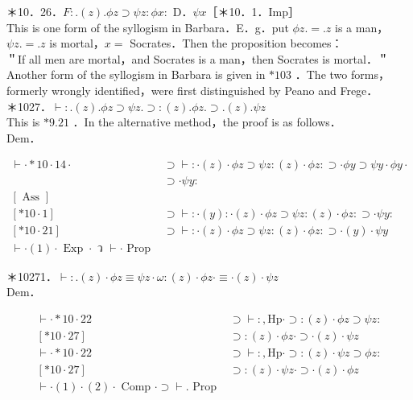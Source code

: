 \documentclass[10pt]{article}
\begin{document}
＊10．26．$F: .(z) . \phi z \supset \psi z: \phi x:$ D．$\psi x$［＊10．1．Imp］\\
This is one form of the syllogism in Barbara．E．g．put $\phi z .=. z$ is a man， $\psi z .=. z$ is mortal，$x=$ Socrates．Then the proposition becomes：\\
＂If all men are mortal，and Socrates is a man，then Socrates is mortal．＂\\
Another form of the syllogism in Barbara is given in $* 103$ ．The two forms，formerly wrongly identified，were first distinguished by Peano and Frege．\\
＊1027．$\vdash: .(z) . \phi z \supset \psi z . \supset:(z) . \phi z . \supset .(z) . \psi z$\\
This is $* 9.21$ ．In the alternative method，the proof is as follows．\\
Dem．

\[
\begin{array}{lc}
\vdash \cdot * 10 \cdot 14 \cdot & \supset \vdash: \cdot(z) \cdot \phi z \supset \psi z:(z) \cdot \phi z: \supset \cdot \phi y \supset \psi y \cdot \phi y \cdot \\
& \supset \cdot \psi y: \\
{[\text { Ass }]} & \\
{[* 10 \cdot 1]} & \supset \vdash: \cdot(y): \cdot(z) \cdot \phi z \supset \psi z:(z) \cdot \phi z: \supset \cdot \psi y:  \tag{1}\\
{[* 10 \cdot 21]} & \supset \vdash: \cdot(z) \cdot \phi z \supset \psi z:(z) \cdot \phi z: \supset \cdot(y) \cdot \psi y \\
\vdash \cdot(1) \cdot \text { Exp } \cdot \text { ว } \vdash \cdot \text { Prop }
\end{array}
\]

＊10271．$\vdash: .(z) \cdot \phi z \equiv \psi z \cdot \omega:(z) \cdot \phi z \cdot \equiv \cdot(z) \cdot \psi z$\\
Dem．

\[
\begin{array}{lc}
\vdash \cdot * 10 \cdot 22 & \supset \vdash:, \mathrm{Hp} \cdot \supset:(z) \cdot \phi z \supset \psi z: \\
{[* 10 \cdot 27]} & \supset:(z) \cdot \phi z \cdot \supset \cdot(z) \cdot \psi z \\
\vdash \cdot * 10 \cdot 22 & \supset \vdash:, \mathrm{Hp} \cdot \supset:(z) \cdot \psi z \supset \phi z: \\
{[* 10 \cdot 27]} & \supset:(z) \cdot \psi z \cdot \supset \cdot(z) \cdot \phi z  \tag{2}\\
\vdash \cdot(1) \cdot(2) \cdot \text { Comp } \cdot \supset \vdash . \text { Prop }
\end{array}
\]
\end{document}
